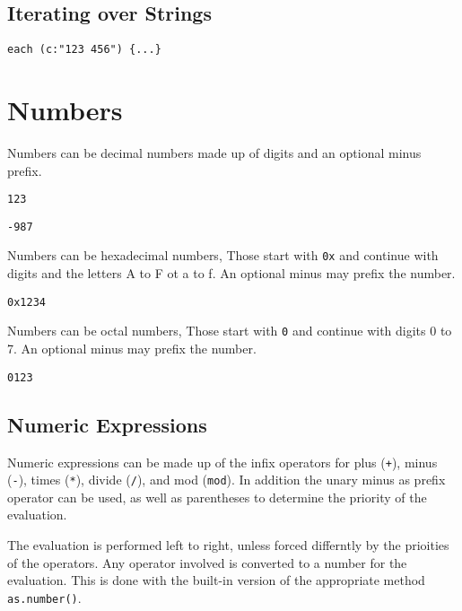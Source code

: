\documentclass[11pt,a4paper]{scrbook}
\newcommand\keyword[1]{\texttt{#1}}
\begin{document}
\subsection{Iterating over Strings}


\begin{lstlisting}[language=BibTool,mathescape=true]
each (c:"123 456") {...}
\end{lstlisting}

\section{Numbers}

Numbers can be decimal numbers made up of digits and an optional minus prefix.

\begin{lstlisting}[language=BibTool]
123
\end{lstlisting}

\begin{lstlisting}[language=BibTool]
-987
\end{lstlisting}

Numbers can be hexadecimal numbers, Those start with \verb|0x| and continue
with digits and the letters A to F ot a to f. An optional minus may prefix the
number.

\begin{lstlisting}[language=BibTool]
0x1234
\end{lstlisting}

Numbers can be octal numbers, Those start with \verb|0| and continue with
digits 0 to 7. An optional minus may prefix the number.

\begin{lstlisting}[language=BibTool]
0123
\end{lstlisting}

\subsection{Numeric Expressions}

Numeric expressions can be made up of the infix operators for plus (\verb|+|),
minus (\verb|-|), times (\verb|*|), divide (\verb|/|), and mod (\verb|mod|).
In addition the unary minus as prefix operator can be used, as well as
parentheses to determine the priority of the evaluation.

The evaluation is performed left to right, unless forced differntly by the
prioities of the operators. Any operator involved is converted to a number for
the evaluation. This is done with the built-in version of the appropriate
method \keyword{as.number()}.
\end{document}

